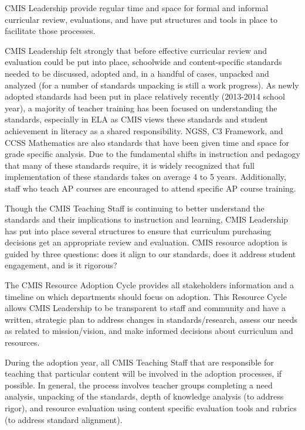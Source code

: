 \documentclass{report}
\begin{document}
\begin{findings}
CMIS Leadership provide regular time and space for formal and informal curricular review, evaluations, and have put structures and tools in place to facilitate those processes. 


CMIS Leadership felt strongly that before effective curricular review and evaluation could be put into place, schoolwide and content-specific standards needed to be discussed, adopted and, in a handful of cases, unpacked and analyzed (for a number of standards unpacking is still a work progress). As newly adopted standards had been  put in place relatively recently (2013-2014 school year), a majority of teacher training has been focused on understanding the standards, especially in ELA as CMIS views these standards and student achievement in literacy as a shared responsibility. NGSS, C3 Framework, and CCSS Mathematics are also standards that have been given time and space for grade specific analysis. Due to the fundamental shifts in instruction and pedagogy that many of these standards require, it is widely recognized that full implementation of these standards takes on average 4 to 5 years. Additionally, staff who teach AP courses are encouraged to attend specific AP course training. 

Though the CMIS Teaching Staff is continuing to better understand the standards and their implications to instruction and learning, CMIS Leadership has put into place several structures to ensure that curriculum purchasing decisions get an appropriate review and evaluation. CMIS resource adoption is guided by three questions: does it align to our standards, does it address student engagement, and is it rigorous?


The CMIS Resource Adoption Cycle provides all stakeholders information and a timeline on which departments should focus on adoption. This Resource Cycle allows CMIS Leadership to be transparent to staff and community and have a written, strategic plan to address changes in standards/research, assess our needs as related to mission/vision, and make informed decisions about curriculum and resources. 

During the adoption year, all CMIS Teaching Staff that are responsible for teaching that particular content will be involved in the adoption processes, if possible. In general, the process involves teacher groups completing a need analysis, unpacking of the standards, depth of knowledge analysis (to address rigor), and resource evaluation using content specific evaluation tools and rubrics (to address standard alignment). 


\end{findings}
\end{document}
